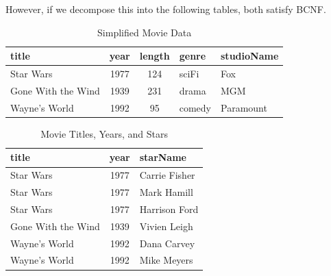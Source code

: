   \begin{example}
    However, if we decompose this into the following tables, both satisfy BCNF. 

    \begin{table}[H]
      \centering
      \begin{tabular}{|l|c|c|l|l|}
      \hline
      \textbf{title} & \textbf{year} & \textbf{length} & \textbf{genre} & \textbf{studioName} \\
      \hline
      Star Wars & 1977 & 124 & sciFi & Fox \\
      Gone With the Wind & 1939 & 231 & drama & MGM \\
      Wayne's World & 1992 & 95 & comedy & Paramount \\
      \hline
      \end{tabular}
      \caption{Simplified Movie Data}
      \label{tab:simplemoviedata}
    \end{table}

    \begin{table}[H]
      \centering
      \begin{tabular}{|l|c|l|}
      \hline
      \textbf{title} & \textbf{year} & \textbf{starName} \\
      \hline
      Star Wars & 1977 & Carrie Fisher \\
      Star Wars & 1977 & Mark Hamill \\
      Star Wars & 1977 & Harrison Ford \\
      Gone With the Wind & 1939 & Vivien Leigh \\
      Wayne's World & 1992 & Dana Carvey \\
      Wayne's World & 1992 & Mike Meyers \\
      \hline
      \end{tabular}
      \caption{Movie Titles, Years, and Stars}
      \label{tab:moviestars}
    \end{table}
  \end{example}

